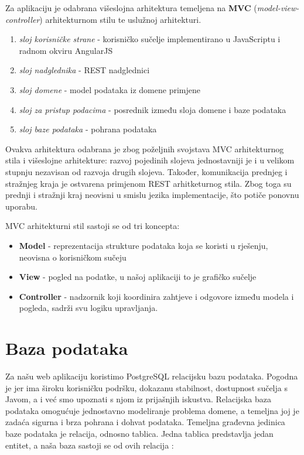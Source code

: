 		Za aplikaciju je odabrana višeslojna arhitektura temeljena na \textbf{MVC} (\textit{model-view-controller}) arhitekturnom stilu te uslužnoj arhitekturi.
		
		\begin{enumerate}
			\item \textit{sloj korisničke strane} - korisničko sučelje implementirano u JavaScriptu i radnom okviru AngularJS
			\item \textit{sloj nadglednika} - REST nadglednici 
			\item \textit{sloj domene} - model podataka iz domene primjene
			\item \textit{sloj za pristup podacima} - posrednik između sloja domene i baze podataka
			\item \textit{sloj baze podataka} - pohrana podataka
		\end{enumerate}
		
		Ovakva arhitektura odabrana je zbog poželjnih svojstava MVC arhitekturnog stila i višeslojne arhitekture: razvoj pojedinih slojeva jednostavniji je i u velikom stupnju nezavisan od razvoja drugih slojeva. Također, komunikacija prednjeg i stražnjeg kraja je ostvarena primjenom REST arhitketurnog stila. Zbog toga su prednji i stražnji kraj neovisni u smislu jezika implementacije, što potiče ponovnu uporabu.
		
		MVC arhitekturni stil sastoji se od tri koncepta:
		\begin{itemize}
			\item \textbf{Model} - reprezentacija strukture podataka koja se koristi u rješenju, neovisna o korisničkom sučeju
			\item \textbf{View} - pogled na podatke, u našoj aplikaciji to je grafičko sučelje
			\item \textbf{Controller} - nadzornik koji koordinira zahtjeve i odgovore između modela i pogleda, sadrži svu logiku upravljanja.
		\end{itemize}
				
		\section{Baza podataka}
			
			Za našu web aplikaciju koristimo PostgreSQL relacijsku bazu podataka. Pogodna je jer ima široku korisničku podršku, dokazanu stabilnost, dostupnost sučelja s Javom, a i već smo upoznati s njom iz prijašnjih iskustva. Relacijska baza podataka omogućuje jednostavno modeliranje problema domene, a temeljna joj je zadaća sigurna i brza pohrana i dohvat podataka. Temeljna građevna jedinica baze podataka je relacija, odnosno tablica. Jedna tablica predstavlja jedan entitet, a naša baza sastoji se od ovih relacija :
		
